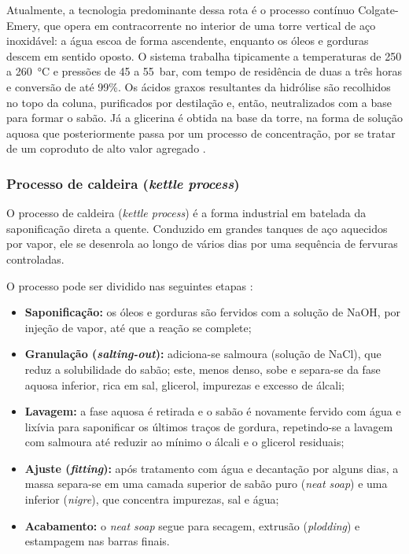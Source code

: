 Atualmente, a tecnologia predominante dessa rota é o processo contínuo Colgate-Emery, que opera em contracorrente no interior de uma torre vertical de aço inoxidável: a água escoa de forma ascendente, enquanto os óleos e gorduras descem em sentido oposto. O sistema trabalha tipicamente a temperaturas de 250 a 260~°C e pressões de 45 a 55~bar, com tempo de residência de duas a três horas e conversão de até 99\%. Os ácidos graxos resultantes da hidrólise são recolhidos no topo da coluna, purificados por destilação e, então, neutralizados com a base para formar o sabão. Já a glicerina é obtida na base da torre, na forma de solução aquosa que posteriormente passa por um processo de concentração, por se tratar de um coproduto de alto valor agregado \cite{sonntag1979fat}.

\subsubsection{Processo de caldeira (\textit{kettle process})}
\label{subsubsec:kettle}

O processo de caldeira (\textit{kettle process}) é a forma industrial em batelada da saponificação direta a quente. Conduzido em grandes tanques de aço aquecidos por vapor, ele se desenrola ao longo de vários dias por uma sequência de fervuras controladas.

O processo pode ser dividido nas seguintes etapas \cite{shreve1984chemical}:

\begin{itemize}
    \item \textbf{Saponificação:} os óleos e gorduras são fervidos com a solução de NaOH, por injeção de vapor, até que a reação se complete;
    \item \textbf{Granulação (\textit{salting-out}):} adiciona-se salmoura (solução de NaCl), que reduz a solubilidade do sabão; este, menos denso, sobe e separa-se da fase aquosa inferior, rica em sal, glicerol, impurezas e excesso de álcali;
    \item \textbf{Lavagem:} a fase aquosa é retirada e o sabão é novamente fervido com água e lixívia para saponificar os últimos traços de gordura, repetindo-se a lavagem com salmoura até reduzir ao mínimo o álcali e o glicerol residuais;
    \item \textbf{Ajuste (\textit{fitting}):} após tratamento com água e decantação por alguns dias, a massa separa-se em uma camada superior de sabão puro (\textit{neat soap}) e uma inferior (\textit{nigre}), que concentra impurezas, sal e água;
    \item \textbf{Acabamento:} o \textit{neat soap} segue para secagem, extrusão (\textit{plodding}) e estampagem nas barras finais.
\end{itemize}

